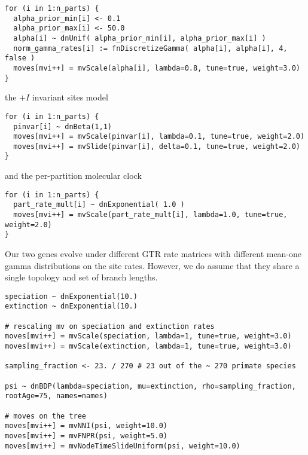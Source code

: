{\tt \small \begin{snugshade*}
\begin{lstlisting}
for (i in 1:n_parts) {
  alpha_prior_min[i] <- 0.1
  alpha_prior_max[i] <- 50.0
  alpha[i] ~ dnUnif( alpha_prior_min[i], alpha_prior_max[i] )
  norm_gamma_rates[i] := fnDiscretizeGamma( alpha[i], alpha[i], 4, false )
  moves[mvi++] = mvScale(alpha[i], lambda=0.8, tune=true, weight=3.0)
}
\end{lstlisting}
\end{snugshade*}}

the $+I$ invariant sites model

{\tt \small \begin{snugshade*}
\begin{lstlisting}
for (i in 1:n_parts) {
  pinvar[i] ~ dnBeta(1,1)
  moves[mvi++] = mvScale(pinvar[i], lambda=0.1, tune=true, weight=2.0)
  moves[mvi++] = mvSlide(pinvar[i], delta=0.1, tune=true, weight=2.0)
}
\end{lstlisting}
\end{snugshade*}}

and the per-partition molecular clock

{\tt \small \begin{snugshade*}
\begin{lstlisting}
for (i in 1:n_parts) {
  part_rate_mult[i] ~ dnExponential( 1.0 )
  moves[mvi++] = mvScale(part_rate_mult[i], lambda=1.0, tune=true, weight=2.0)
}
\end{lstlisting}
\end{snugshade*}}

Our two genes evolve under different GTR rate matrices with different mean-one gamma distributions on the site rates.
However, we do assume that they share a single topology and set of branch lengths.
{\tt \begin{snugshade*}
\begin{lstlisting}
speciation ~ dnExponential(10.)
extinction ~ dnExponential(10.)

# rescaling mv on speciation and extinction rates
moves[mvi++] = mvScale(speciation, lambda=1, tune=true, weight=3.0)
moves[mvi++] = mvScale(extinction, lambda=1, tune=true, weight=3.0)

sampling_fraction <- 23. / 270 # 23 out of the ~ 270 primate species

psi ~ dnBDP(lambda=speciation, mu=extinction, rho=sampling_fraction, rootAge=75, names=names)

# moves on the tree
moves[mvi++] = mvNNI(psi, weight=10.0)
moves[mvi++] = mvFNPR(psi, weight=5.0)
moves[mvi++] = mvNodeTimeSlideUniform(psi, weight=10.0)
\end{lstlisting}
\end{snugshade*}}

